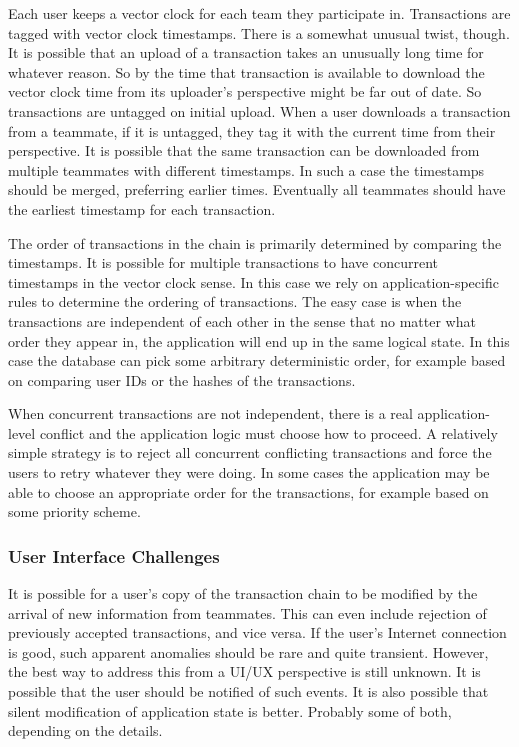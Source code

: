 \documentclass[pldi-cameraready,10pt]{sigplanconf-pldi16}
\begin{document}
Each user keeps a vector clock for each team they participate in.
Transactions are tagged with vector clock timestamps.
There is a somewhat unusual twist, though.
It is possible that an upload of a transaction takes an unusually long time for whatever reason.
So by the time that transaction is available to download the vector clock time from its uploader's perspective might be far out of date.
So transactions are untagged on initial upload.
When a user downloads a transaction from a teammate, if it is untagged, they tag it with the current time from their perspective.
It is possible that the same transaction can be downloaded from multiple teammates with different timestamps.
In such a case the timestamps should be merged, preferring earlier times.
Eventually all teammates should have the earliest timestamp for each transaction.

The order of transactions in the chain is primarily determined by comparing the timestamps.
It is possible for multiple transactions to have concurrent timestamps in the vector clock sense.
In this case we rely on application-specific rules to determine the ordering of transactions.
The easy case is when the transactions are independent of each other in the sense that no matter what order they appear in, the application will end up in the same logical state.
In this case the database can pick some arbitrary deterministic order, for example based on comparing user IDs or the hashes of the transactions.

When concurrent transactions are not independent, there is a real application-level conflict and the application logic must choose how to proceed.
A relatively simple strategy is to reject all concurrent conflicting transactions and force the users to retry whatever they were doing.
In some cases the application may be able to choose an appropriate order for the transactions, for example based on some priority scheme.

\subsubsection{User Interface Challenges}

It is possible for a user's copy of the transaction chain to be modified by the arrival of new information from teammates.
This can even include rejection of previously accepted transactions, and vice versa.
If the user's Internet connection is good, such apparent anomalies should be rare and quite transient.
However, the best way to address this from a UI/UX perspective is still unknown.
It is possible that the user should be notified of such events.
It is also possible that silent modification of application state is better.
Probably some of both, depending on the details.
\end{document}

